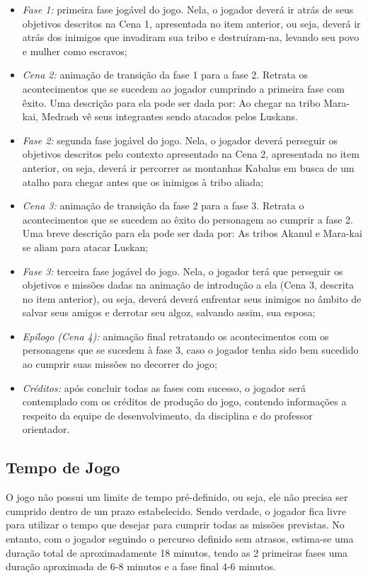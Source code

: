\begin{itemize}
\item \textit{Fase 1:} primeira fase jogável do jogo. Nela, o jogador deverá ir atrás de seus objetivos descritos na Cena 1, apresentada no item anterior, ou seja, deverá ir atrás dos inimigos que invadiram sua tribo e destruíram-na, levando seu povo e mulher como escravos;
\item \textit{Cena 2:} animação de transição da fase 1 para a fase 2. Retrata os acontecimentos que se sucedem ao jogador cumprindo a primeira fase com êxito. Uma descrição para ela pode ser dada por: Ao chegar na tribo Mara-kai, Medrash vê seus integrantes sendo atacados pelos Luskans.
\item \textit{Fase 2:} segunda fase jogável do jogo. Nela, o jogador deverá perseguir os objetivos descritos pelo contexto apresentado na Cena 2, apresentada no item anterior, ou seja, deverá ir percorrer as montanhas Kabalus em busca de um atalho para chegar antes que os inimigos à tribo aliada;
\item \textit{Cena 3:} animação de transição da fase 2 para a fase 3. Retrata o acontecimentos que se sucedem ao êxito do personagem ao cumprir a fase 2. Uma breve descrição para ela pode ser dada por: As tribos Akanul e Mara-kai se aliam para atacar Luskan;
\item \textit{Fase 3:} terceira fase jogável do jogo. Nela, o jogador terá que perseguir os objetivos e missões dadas na animação de introdução a ela (Cena 3, descrita no item anterior), ou seja, deverá deverá enfrentar seus inimigos no âmbito de salvar seus amigos e derrotar seu algoz, salvando assim, sua esposa;
\item \textit{Epílogo (Cena 4):} animação final retratando os acontecimentos com os personagens que se sucedem à fase 3, caso o jogador tenha sido bem sucedido ao cumprir suas missões no decorrer do jogo;
\item \textit{Créditos:} após concluir todas as fases com sucesso, o jogador será contemplado com os créditos de produção do jogo, contendo informações a respeito  da equipe de desenvolvimento, da disciplina e do professor orientador.
\end{itemize}

\subsection{Tempo de Jogo}
O jogo não possui um limite de tempo pré-definido, ou seja, ele não precisa ser cumprido dentro de um prazo estabelecido. Sendo verdade, o jogador fica livre para utilizar o tempo que desejar para cumprir todas as missões previstas. No entanto, com o jogador seguindo o percurso definido sem atrasos, estima-se uma duração total de aproximadamente 18 minutos, tendo as 2 primeiras fases uma duração aproximada de 6-8 minutos e a fase final 4-6 minutos.

